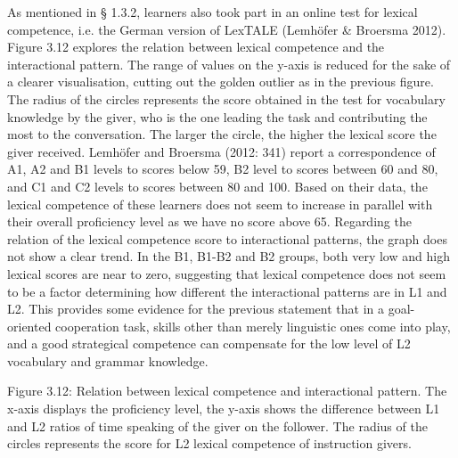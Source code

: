 \begin{styleStandard}
As mentioned in § 1.3.2, learners also took part in an online test for lexical competence, i.e. the German version of LexTALE (Lemhöfer \& Broersma 2012). Figure 3.12 explores the relation between lexical competence and the interactional pattern. The range of values on the y-axis is reduced for the sake of a clearer visualisation, cutting out the golden outlier as in the previous figure. The radius of the circles represents the score obtained in the test for vocabulary knowledge by the giver, who is the one leading the task and contributing the most to the conversation. The larger the circle, the higher the lexical score the giver received. Lemhöfer and Broersma (2012: 341) report a correspondence of A1, A2 and B1 levels to scores below 59, B2 level to scores between 60 and 80, and C1 and C2 levels to scores between 80 and 100. Based on their data, the lexical competence of these learners does not seem to increase in parallel with their overall proficiency level as we have no score above 65. Regarding the relation of the lexical competence score to interactional patterns, the graph does not show a clear trend. In the B1, B1-B2 and B2 groups, both very low and high lexical scores are near to zero, suggesting that lexical competence does not seem to be a factor determining how different the interactional patterns are in L1 and L2. This provides some evidence for the previous statement that in a goal-oriented cooperation task, skills other than merely linguistic ones come into play, and a good strategical competence can compensate for the low level of L2 vocabulary and grammar knowledge.
\end{styleStandard}

\begin{stylecaption}
  [Warning: Image ignored] %
 
\end{stylecaption}

\begin{stylecaption}
Figure 3.12: Relation between lexical competence and interactional pattern. The x-axis displays the proficiency level, the y-axis shows the difference between L1 and L2 ratios of time speaking of the giver on the follower. The radius of the circles represents the score for L2 lexical competence of instruction givers. 
\end{stylecaption}

